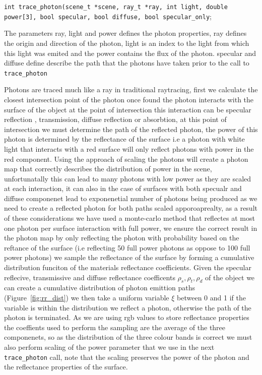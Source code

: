 \texttt{int trace\_photon(scene\_t *scene, ray\_t *ray, int light, double power[3], bool specular, bool diffuse, bool specular\_only};

The parameters ray, light and power defines the photon properties, ray defines the origin and direction of the photon, light is an index
to the light from which this light was emited and the power contains the flux of the photon. specular and diffuse
define describe the path that the photons have taken prior to the call to \texttt{trace\_photon}

Photons are traced much like a ray in traditional raytracing, first we calculate the closest intersection point of the photon
once found the photon interacts with the surface of the object at the point of intersection this interaction can be specular 
reflection , transmission, diffuse reflection or absorbtion, at this point of intersection we must determine the path of the reflected
photon, the power of this photon is determined by the reflectance of the surface i.e a photon with white light that interacts with
a red surface will only reflect photons with power in the red component. Using the approach of scaling the photons will create a photon
map that correctly describes the distribution of power in the scene, unfortunatally this can lead to many photons with low power as they
are scaled at each interaction, it can also in the case of surfaces with both specualr and diffuse componenet lead to exponenetial number
of photons being produced as we need to create a reflected photon for both paths scaled apporoaprealty, as a result of these considerations
we have used a monte-carlo method that reflectes at most one photon
per surface interaction with full power, we ensure the correct result in the photon map by only reflecting the photon
with probability based on the reftance of the surface (i.e reflecting 50 full power photons as oppose to 100 full power photons)
we sample the reflectance of the surface by forming a cumulative distribution funciton of the materials reflectance coefficients.
Given the specular reflecive, transmissive and diffuse reflectance coefficents $\rho_{s}, \rho_{t}, \rho_{d}$
of the object we can create a cumulative distribution of photon emittion paths (Figure~\ref{fig:rr_dist}) 
we then take a uniform variable $\xi$ between 0 and 1 if the variable is within the distribution we reflect a photon, otherwise
the path of the photon is terminated. As we are using rgb values to store reflectance properties the
coeffients used to perform the sampling are the average of the three componenets, so as the distribution of the three
colour bands is correct we must also perform scaling of the power parameter that we use in the next \texttt{trace\_photon}
call, note that the scaling preserves the power of the photon and the reflectance properties of the surface.

